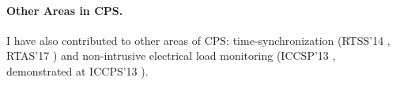 \documentclass[10pt]{article}
\begin{document}

\paragraph{Other Areas in CPS. }
I have also contributed to other areas of CPS:
time-synchronization (RTSS'14 \cite{buevich2013hardware}, RTAS'17 \cite{dongare2017pulsar}) and non-intrusive electrical load
monitoring (ICCSP'13 \cite{rajagopal2013magnetic}, demonstrated at ICCPS'13 \cite{rajagopal2013demo}).
\end{document}
